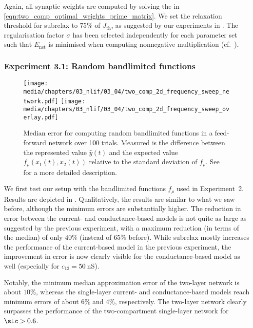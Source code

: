 Again, all synaptic weights are computed by solving the \QP in \cref{eqn:two_comp_optimal_weights_prime_matrix}.
We set the relaxation threshold for \gls{subrelax} to $75\%$ of $J_\mathrm{th}$, as suggested by our experiments in .
The regularisation factor $\sigma$ has been selected independently for each parameter set such that $E_\mathrm{net}$ is minimised when computing nonnegative multiplication (cf.~).

\subsubsection{Experiment 3.1: Random bandlimited functions}

\begin{figure}[t]
	\centering
	{\texttt{[image: media/chapters/03\_nlif/03\_04/two\_comp\_2d\_frequency\_sweep\_network.pdf]}}%
	\kern-158.06mm\texttt{[image: media/chapters/03\_nlif/03\_04/two\_comp\_2d\_frequency\_sweep\_overlay.pdf]}
	\caption[Median error for computing random bandlimited functions in a feed-forward network over 100 trials]{Median error for computing random bandlimited functions in a feed-forward network over 100 trials. Measured \NRMSE is the difference between the represented value $\hat y(t)$ and the expected value $f_\rho(x_1(t), x_2(t))$ relative to the standard deviation of $f_\rho$. See  for a more detailed description.}
	\label{fig:frequency_sweep_network}
\end{figure}

We first test our setup with the bandlimited functions $f_\rho$ used in Experiment~2.
Results are depicted in .
Qualitatively, the results are similar to what we saw before, although the minimum errors are substantially higher.
The reduction in error between the current- and conductance-based models is not quite as large as suggested by the previous experiment, with a maximum reduction (in terms of the median) of only $40\%$ (instead of $65\%$ before).
While \gls{subrelax} mostly increases the performance of the current-based model in the previous experiment, the improvement in error is now clearly visible for the conductance-based model as well (especially for $c_{12} = \SI{50}{\nano\siemens}$).

Notably, the minimum median approximation error of the two-layer network is about $10\%$, whereas the single-layer current- and conductance-based models reach minimum errors of about $6\%$ and $4\%$, respectively. The two-layer network clearly surpasses the performance of the two-compartment \LIF single-layer network for $\slc > 0.6$.

